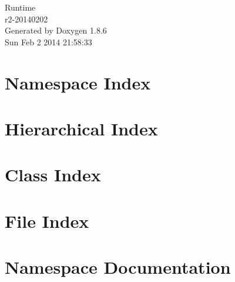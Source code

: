 \documentclass[twoside]{book}
\newcommand{\clearemptydoublepage}{%
  \newpage{\pagestyle{empty}\cleardoublepage}%
}
\begin{document}
\hypersetup{pageanchor=false}
\begin{titlepage}
\vspace*{7cm}
\begin{center}%
{\Large Runtime \\[1ex]\large r2-\/20140202 }\\
\vspace*{1cm}
{\large Generated by Doxygen 1.8.6}\\
\vspace*{0.5cm}
{\small Sun Feb 2 2014 21:58:33}\\
\end{center}
\end{titlepage}
\clearemptydoublepage
\tableofcontents
\clearemptydoublepage
{}
\hypersetup{pageanchor=true}

\chapter{Namespace Index}

\chapter{Hierarchical Index}

\chapter{Class Index}

\chapter{File Index}

\chapter{Namespace Documentation}


\end{document}
